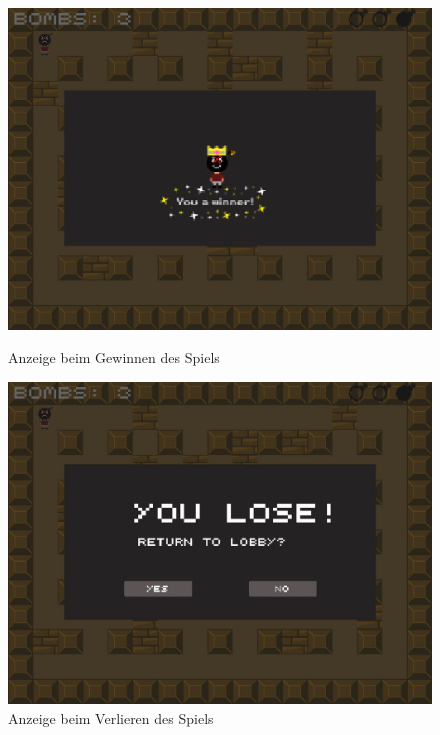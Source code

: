 \documentclass[conference]{IEEEtran}
\begin{document}
\begin{figure}
\centering
\begin{minipage}{0.5\textwidth}
  \centering
  \includegraphics[width=0.9\linewidth]{winscreen.jpg}
  \caption{Anzeige beim Gewinnen des Spiels}
  \label{fig:test1}
\end{minipage}%
\begin{minipage}{0.5\textwidth}
  \centering
  \includegraphics[width=0.9\linewidth]{losescreen.jpg}
  \caption{Anzeige beim Verlieren des Spiels}
  \label{fig:test2}
\end{minipage}
\end{figure}
\end{document}
